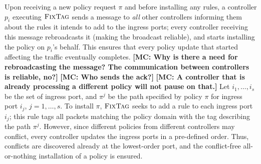 \documentclass[11pt,pdftex,letter]{article}
\newcommand{\CPO}{\textsc{FixTag}}
\newcommand{\eg}{{\it e.g.}}
\newcommand{\mcnote}[1]{\textcolor{heraldBlue}{\small \bf [MC: #1]}}
\newcommand{\mcnote}[1]{}
\begin{document}
Upon receiving a new policy request $\pi$ and before installing any rules,
a controller $p_i$ executing $\CPO$ sends a message to \emph{all}
other controllers
informing them about the rules it intends to add to the
ingress ports; every controller receiving this message
rebroadcasts it (making the broadcast reliable), and starts installing the policy on $p_i$'s behalf.
This ensures that every policy update that started affecting the
traffic eventually completes.
\mcnote{Why is there a need for rebroadcasting the message? The communication between controllers is reliable, no?}
\mcnote{Who sends the ack?}
\mcnote{A controller that is already processing a different policy will not pause on that.}
Let $i_1,\ldots,i_s$ be the set of ingress port, and $\pi^j$ be the
path specified by policy $\pi$ for ingress port $i_j$, $j=1,\ldots,s$.
To install $\pi$, $\CPO$ seeks to add a rule to each ingress port $i_j$; this rule tags all
packets matching the policy domain with the tag describing the path $\pi^j$.
However, since different policies from different controllers
may conflict, %
every controller updates the ingress ports in a pre-defined order.
Thus, conflicts are discovered already at the lowest-order port, and the conflict-free all-or-nothing installation of a policy
is ensured.
\end{document}
